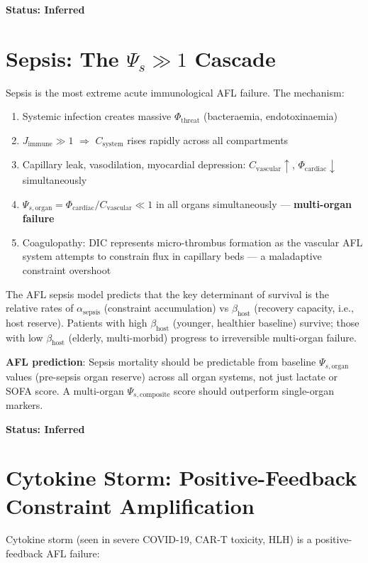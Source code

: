 \documentclass[12pt,a4paper]{article}
\begin{document}
\textbf{Status: Inferred}

\section{Sepsis: The $\Psi_s \gg 1$ Cascade}

Sepsis is the most extreme acute immunological AFL failure. The mechanism:

\begin{enumerate}
    \item Systemic infection creates massive $\Phi_{\mathrm{threat}}$ (bacteraemia, endotoxinaemia)
    \item $J_{\mathrm{immune}} \gg 1$ $\Rightarrow$ $C_{\mathrm{system}}$ rises rapidly across all compartments
    \item Capillary leak, vasodilation, myocardial depression: $C_{\mathrm{vascular}} \uparrow$, $\Phi_{\mathrm{cardiac}} \downarrow$ simultaneously
    \item $\Psi_{s,\mathrm{organ}} = \Phi_{\mathrm{cardiac}} / C_{\mathrm{vascular}} \ll 1$ in all organs simultaneously --- \textbf{multi-organ failure}
    \item Coagulopathy: DIC represents micro-thrombus formation as the vascular AFL system attempts to constrain flux in capillary beds --- a maladaptive constraint overshoot
\end{enumerate}

The AFL sepsis model predicts that the key determinant of survival is the relative rates of $\alpha_{\mathrm{sepsis}}$ (constraint accumulation) vs $\beta_{\mathrm{host}}$ (recovery capacity, i.e., host reserve). Patients with high $\beta_{\mathrm{host}}$ (younger, healthier baseline) survive; those with low $\beta_{\mathrm{host}}$ (elderly, multi-morbid) progress to irreversible multi-organ failure.

\textbf{AFL prediction}: Sepsis mortality should be predictable from baseline $\Psi_{s,\mathrm{organ}}$ values (pre-sepsis organ reserve) across all organ systems, not just lactate or SOFA score. A multi-organ $\Psi_{s,\mathrm{composite}}$ score should outperform single-organ markers.

\textbf{Status: Inferred}

\section{Cytokine Storm: Positive-Feedback Constraint Amplification}

Cytokine storm (seen in severe COVID-19, CAR-T toxicity, HLH) is a positive-feedback AFL failure:
\end{document}
